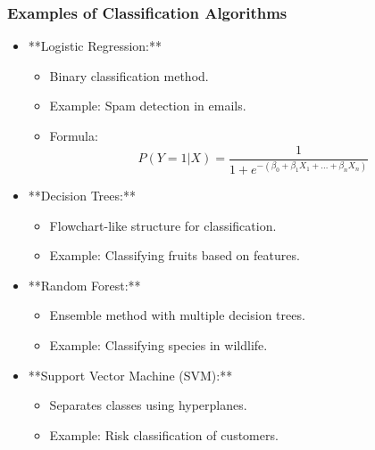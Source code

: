 \documentclass[aspectratio=169]{beamer}
\begin{document}
\begin{frame}[fragile]
  \frametitle{Examples of Classification Algorithms}

  \begin{itemize}
    \item **Logistic Regression:**
      \begin{itemize}
        \item Binary classification method.
        \item Example: Spam detection in emails.
        \item Formula:
        \begin{equation}
          P(Y=1|X) = \frac{1}{1 + e^{-(\beta_0 + \beta_1X_1 + \ldots + \beta_nX_n)}}
        \end{equation}
      \end{itemize}

    \item **Decision Trees:**
      \begin{itemize}
        \item Flowchart-like structure for classification.
        \item Example: Classifying fruits based on features.
      \end{itemize}

    \item **Random Forest:**
      \begin{itemize}
        \item Ensemble method with multiple decision trees.
        \item Example: Classifying species in wildlife.
      \end{itemize}

    \item **Support Vector Machine (SVM):**
      \begin{itemize}
        \item Separates classes using hyperplanes.
        \item Example: Risk classification of customers.
      \end{itemize}
  \end{itemize}
\end{frame}
\end{document}
